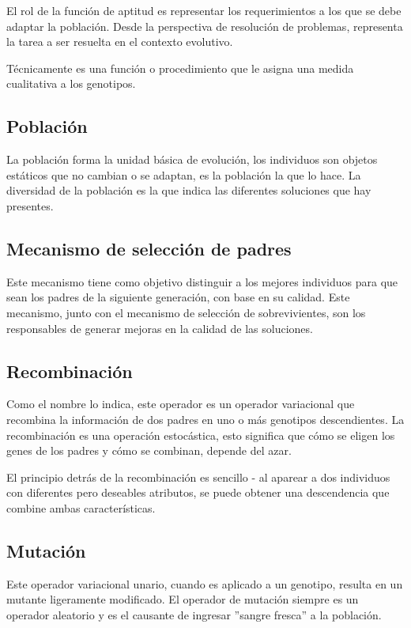 El rol de la función de aptitud es representar los requerimientos a los que se debe adaptar la población. Desde la perspectiva de resolución de problemas, representa la tarea a ser resuelta en el contexto evolutivo.

Técnicamente  es una función o procedimiento que le asigna una medida cualitativa a los genotipos.

\subsection{Población}

La población forma la unidad básica de evolución, los individuos son objetos estáticos que no cambian o se adaptan, es la población la que lo hace. La diversidad de la población es la que indica las diferentes soluciones que hay presentes.

\subsection{Mecanismo de selección de padres}

Este mecanismo tiene como objetivo distinguir a los mejores individuos para que sean los padres de la siguiente generación, con base en su calidad. Este mecanismo, junto con el mecanismo de selección de sobrevivientes, son los responsables de generar mejoras en la calidad de las soluciones.

\subsection{Recombinación}

Como el nombre lo indica, este operador es un operador variacional que recombina la información de dos padres en uno o más genotipos descendientes. La recombinación es una operación estocástica, esto significa que cómo se eligen los genes de los padres y cómo se combinan, depende del azar.

El principio detrás de la recombinación es sencillo - al aparear a dos individuos con diferentes pero deseables atributos, se puede obtener una descendencia que combine ambas características. 

\subsection{Mutación}

Este operador variacional unario, cuando es aplicado a un genotipo, resulta en un mutante ligeramente modificado. El operador de mutación siempre es un operador aleatorio y es el causante de ingresar ''sangre fresca'' a la población.

